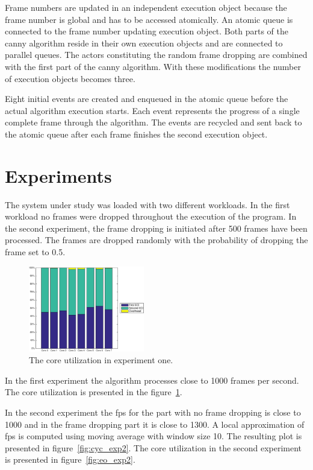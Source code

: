 \documentclass[a4paper,10pt]{article}
\begin{document}
Frame numbers are updated in an independent execution object because the frame number is global and has to be accessed atomically. An atomic queue is connected to the frame number updating execution object. Both parts of the canny algorithm reside in their own execution objects and are connected to parallel queues. The actors constituting the random frame dropping are combined with the first part of the canny algorithm. With these modifications the number of execution objects becomes three.

Eight initial events are created and enqueued in the atomic queue before the actual algorithm execution starts. Each event represents the progress of a single complete frame through the algorithm. The events are recycled and sent back to the atomic queue after each frame finishes the second execution object.

\section{Experiments}
The system under study was loaded with two different workloads. In the first workload no frames were dropped throughout the execution of the program. In the second experiment, the frame dropping is initiated after 500 frames have been processed. The frames are dropped randomly with the probability of dropping the frame set to 0.5.

\begin{figure}
    \centering
        \includegraphics[width=0.45\textwidth]{exp1_eo.eps}
        \caption{The core utilization in experiment one.}
        \label{fig:eo_exp1}
\end{figure}

In the first experiment the algorithm processes close to 1000 frames per second. The core utilization is presented in the figure~\ref{fig:eo_exp1}.

In the second experiment the fps for the part with no frame dropping is close to 1000 and in the frame dropping part it is close to 1300. A local approximation of fps is computed using moving average with window size 10. The resulting plot is presented in figure~\ref{fig:cyc_exp2}. The core utilization in the second experiment is presented in figure~\ref{fig:eo_exp2}.
\end{document}
